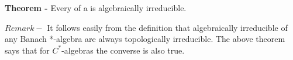 \documentclass[12pt]{article}
\begin{document}
{\bf Theorem -} Every  of a  is algebraically irreducible.

$Remark -$ It follows easily from the definition that algebraically irreducible  of any Banach *-algebra are always topologically irreducible. The above theorem says that for $C^*$-algebras the converse is also true.
\end{document}
